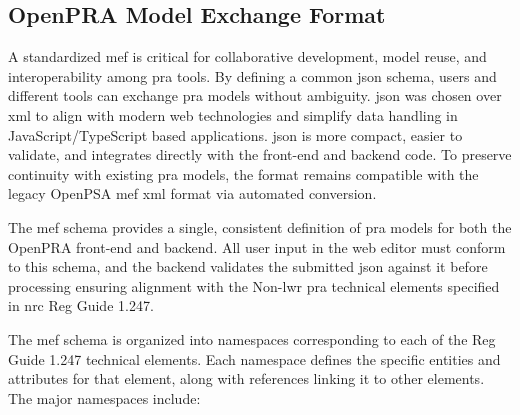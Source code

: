 \subsection{OpenPRA Model Exchange Format}

A standardized \acrfull{mef} is critical for collaborative development, model reuse, and interoperability among \acrshort{pra} tools.  By defining a common \acrshort{json} schema, users and different tools can exchange \acrshort{pra} models without ambiguity.  \acrshort{json} was chosen over \acrshort{xml} to align with modern web technologies and simplify data handling in JavaScript/TypeScript based applications. \acrshort{json} is more compact, easier to validate, and integrates directly with the front-end and backend code.  To preserve continuity with existing \acrshort{pra} models, the format remains compatible with the legacy OpenPSA \acrshort{mef} \acrshort{xml} format via automated conversion.

The \acrshort{mef} schema provides a single, consistent definition of \acrshort{pra} models for both the OpenPRA front-end and backend. All user input in the web editor must conform to this schema, and the backend validates the submitted \acrshort{json} against it before processing ensuring alignment with the Non-\acrshort{lwr} \acrshort{pra} technical elements specified in \acrshort{nrc} Reg Guide 1.247.

The \acrshort{mef} schema is organized into namespaces corresponding to each of the Reg Guide 1.247 technical elements.  Each namespace defines the specific entities and attributes for that element, along with references linking it to other elements. The major namespaces include:

